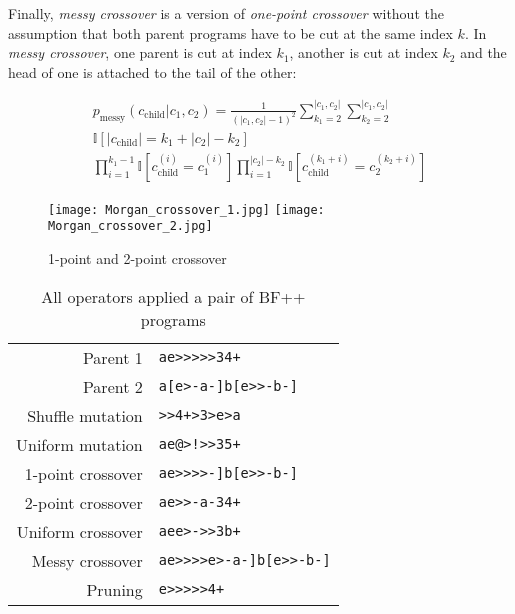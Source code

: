 Finally, \emph{messy crossover} is a version of \emph{one-point crossover} without the assumption that both parent programs have to be cut at the same index $k$.
In \emph{messy crossover}, one parent is cut at index $k_1$, another is cut at index $k_2$ and the head of one is attached to the tail of the other:

\begin{multline}
    p_\text{messy}(c_\text{child}|c_1,c_2) =
        \frac{1}{(|c_1,c_2|-1)^2}
        \sum\limits_{k_1=2}^{|c_1,c_2|} \sum\limits_{k_2=2}^{|c_1,c_2|} \\ \mathbb{I}[|c_\text{child}|=k_1+|c_2|-k_2] \\ \prod\limits_{i=1}^{k_1-1} \mathbb{I}[c_\text{child}^{(i)} = c_1^{(i)}] \prod\limits_{i=1}^{|c_2|-k_2} \mathbb{I}[c_\text{child}^{(k_1+i)} = c_2^{(k_2+i)}]
\end{multline}

\begin{figure}
    \centering
    \texttt{[image: Morgan\_crossover\_1.jpg]}
    \texttt{[image: Morgan\_crossover\_2.jpg]}
    \caption{1-point and 2-point crossover \cite{evocritique}}
    \label{fig:crossover}
\end{figure}

\begin{table}
    \centering
    \begin{tabular}{r|l}
         Parent 1 & \color{blue}\verb|ae>>>>>34+| \\
         Parent 2 & \color{red}\verb|a[e>-a-]b[e>>-b-]| \\
         \midrule
         Shuffle mutation & \color{blue}\verb|>>4+>3>e>a| \\
         Uniform mutation & \color{blue}\verb|ae|\color{black}\verb|@|\color{blue}\verb|>|\color{black}\verb|!|\color{blue}\verb|>>3|\color{black}\verb|5|\color{blue}\verb|+| \\
         1-point crossover & \color{blue}\verb|ae>>>>|\color{red}\verb|-]b[e>>-b-]| \\
         2-point crossover & \color{blue}\verb|ae>|\color{red}\verb|>-a-|\color{blue}\verb|34+| \\
         Uniform crossover & \color{blue}\verb|ae|\color{red}\verb|e|\color{blue}\verb|>|\color{red}\verb|-|\color{blue}\verb|>>3|\color{red}\verb|b|\color{blue}\verb|+| \\
         Messy crossover & \color{blue}\verb|ae>>>>|\color{red}\verb|e>-a-]b[e>>-b-]| \\
         Pruning & \color{blue}\verb|e>>>>>4+| \\
    \end{tabular}
    \caption{All operators applied a pair of BF++ programs}
\end{table}


